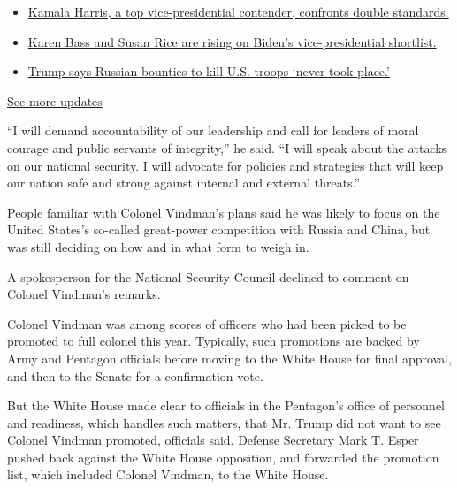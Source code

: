 \begin{itemize}
\tightlist
\item
  \href{https://www.nytimes.com/2020/07/31/us/elections/biden-vs-trump.html?action=click\&pgtype=Article\&state=default\&region=MAIN_CONTENT_1\&context=storylines_live_updates\#link-29fdff45}{Kamala
  Harris, a top vice-presidential contender, confronts double
  standards.}
\item
  \href{https://www.nytimes.com/2020/07/31/us/elections/biden-vs-trump.html?action=click\&pgtype=Article\&state=default\&region=MAIN_CONTENT_1\&context=storylines_live_updates\#link-13ec3d9c}{Karen
  Bass and Susan Rice are rising on Biden's vice-presidential
  shortlist.}
\item
  \href{https://www.nytimes.com/2020/07/31/us/elections/biden-vs-trump.html?action=click\&pgtype=Article\&state=default\&region=MAIN_CONTENT_1\&context=storylines_live_updates\#link-49e9a016}{Trump
  says Russian bounties to kill U.S. troops `never took place.'}
\end{itemize}

\href{https://www.nytimes.com/2020/07/31/us/elections/biden-vs-trump.html?action=click\&pgtype=Article\&state=default\&region=MAIN_CONTENT_1\&context=storylines_live_updates}{See
more updates}

``I will demand accountability of our leadership and call for leaders of
moral courage and public servants of integrity,'' he said. ``I will
speak about the attacks on our national security. I will advocate for
policies and strategies that will keep our nation safe and strong
against internal and external threats.''

People familiar with Colonel Vindman's plans said he was likely to focus
on the United States's so-called great-power competition with Russia and
China, but was still deciding on how and in what form to weigh in.

A spokesperson for the National Security Council declined to comment on
Colonel Vindman's remarks.

Colonel Vindman was among scores of officers who had been picked to be
promoted to full colonel this year. Typically, such promotions are
backed by Army and Pentagon officials before moving to the White House
for final approval, and then to the Senate for a confirmation vote.

But the White House made clear to officials in the Pentagon's office of
personnel and readiness, which handles such matters, that Mr. Trump did
not want to see Colonel Vindman promoted, officials said. Defense
Secretary Mark T. Esper pushed back against the White House opposition,
and forwarded the promotion list, which included Colonel Vindman, to the
White House.

